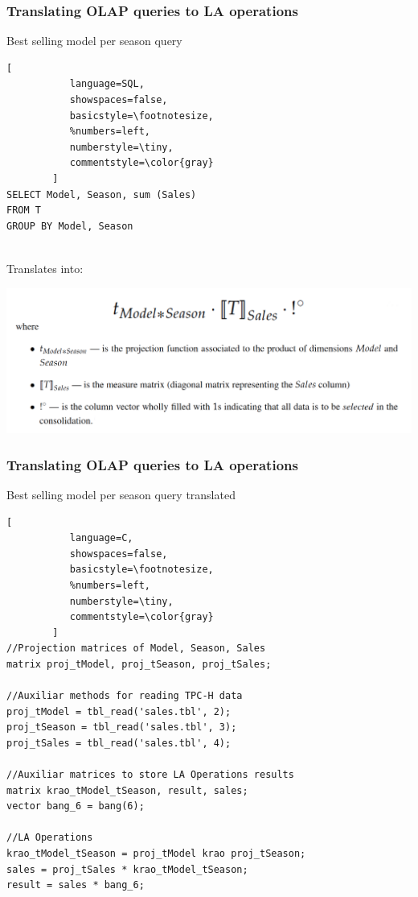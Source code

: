 \documentclass{beamer}
\begin{document}
\begin{frame}[fragile]
\frametitle{Translating OLAP queries to LA operations}


\begin{block}{Best selling model per season query}
\begin{lstlisting}[
           language=SQL,
           showspaces=false,
           basicstyle=\footnotesize,
           %numbers=left,
           numberstyle=\tiny,
           commentstyle=\color{gray}
        ]
SELECT Model, Season, sum (Sales)
FROM T
GROUP BY Model, Season
\end{lstlisting}
\end{block}


\\Translates into:\par 

\includegraphics[width=\textwidth]{images/query_dsl.png}


\end{frame}

\begin{frame}[fragile]
\frametitle{Translating OLAP queries to LA operations}




\begin{block}{Best selling model per season query translated }
\begin{lstlisting}[
           language=C,
           showspaces=false,
           basicstyle=\footnotesize,
           %numbers=left,
           numberstyle=\tiny,
           commentstyle=\color{gray}
        ]
//Projection matrices of Model, Season, Sales
matrix proj_tModel, proj_tSeason, proj_tSales;

//Auxiliar methods for reading TPC-H data
proj_tModel = tbl_read('sales.tbl', 2);
proj_tSeason = tbl_read('sales.tbl', 3);
proj_tSales = tbl_read('sales.tbl', 4);

//Auxiliar matrices to store LA Operations results
matrix krao_tModel_tSeason, result, sales;
vector bang_6 = bang(6);

//LA Operations
krao_tModel_tSeason = proj_tModel krao proj_tSeason;
sales = proj_tSales * krao_tModel_tSeason; 
result = sales * bang_6;

\end{lstlisting}
\end{block}

\end{frame}
\end{document}
